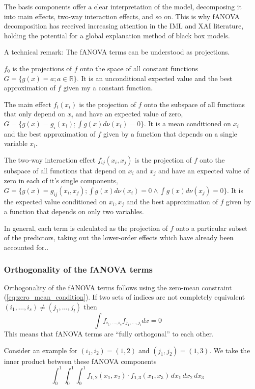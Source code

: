 The basis components offer a clear interpretation of the model, decomposing it into main effects, two-way interaction effects, and so on. This is why fANOVA decomposition has received increasing attention in the IML and XAI literature, holding the potential for a global explanation method of black box models.\par

A technical remark: The fANOVA terms can be understood as projections.\par

$f_0$ is the projections of $f$ onto the space of all constant functions $G = \{g(x) = a; a \in \mathbb{R}\}$. It is an unconditional expected value and the best approximation of $f$ given my a constant function.\par

The main effect $f_i(x_i)$ is the projection of $f$ onto the subspace of all functions that only depend on $x_i$ and have an expected value of zero, $G = \{g(x) = g_i(x_i); \int g(x) d\nu (x_i) = 0\}$. It is a mean conditioned on $x_i$ and the best approximation of $f$ given by a function that depends on a single variable $x_i$.\par

The two-way interaction effect $f_{ij}(x_i,x_j)$ is the projection of $f$ onto the subspace of all functions that depend on $x_i$ and $x_j$ and have an expected value of zero in each of it's single components, $G = \{g(x) = g_{ij}(x_i, x_j); \int g(x) d\nu (x_i) = 0 \land \int g(x) d\nu (x_j) = 0\}$. It is the expected value conditioned on $x_i, x_j$ and the best approximation of $f$ given by a function that depends on only two variables.\par
In general, \ldq each term is calculated as the projection of $f$ onto a particular subset of the predictors, taking out the lower-order effects which have already been accounted for.\rdq \cite{hooker_discovering_2004}.\par

\subsubsection*{Orthogonality of the fANOVA terms}
Orthogonality of the fANOVA terms follows using the zero-mean constraint (\autoref{eq:zero_mean_condition}). If two sets of indices are not completely equivalent $(i_1, \dots, i_s) \neq (j_1, \dots, j_l)$ then
\begin{equation}
    \int f_{i_{1}, \dots, i_{s}} f_{j_{1}, \dots, j_{l}} dx = 0
    \label{eq:orthogonality}
\end{equation}
This means that fANOVA terms are ``fully orthogonal'' to each other.\par
Consider an example for $(i_1, i_2) = (1, 2)$ and $(j_1, j_2) = (1, 3)$. We take the inner product between these fANOVA components
\[
\int_0^1 \int_0^1 \int_0^1 f_{1,2}(x_1, x_2) \cdot f_{1,3}(x_1, x_3) \, dx_1 \, dx_2 \, dx_3
\]

